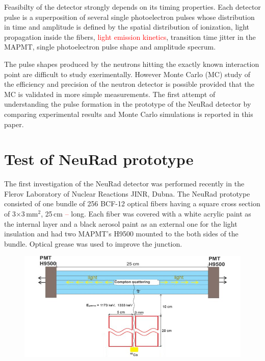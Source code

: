 \documentclass{webofc}
\newcommand{\red}[1]{\textcolor{red}{#1}}
\begin{document}
Feasibilty of the detector strongly depends on its timing properties. Each detector pulse is a superposition of several single photoelectron pulses whose distribution in time and amplitude is defined by the  spatial distribution of ionization, light propagation inside the fibers, \red{light emission kinetics}, transition time jitter in the MAPMT, single photoelectron pulse shape and  amplitude specrum.  

The pulse shapes produced by the neutrons hitting the exactly known interaction point are difficult to study exerimentally. However Monte Carlo (MC) study of the efficiency and precision of the neutron detector is possible provided that the MC is validated in more simple measurements.
The first attempt of understanding the pulse formation in the prototype of the NeuRad  detector by comparing experimental results and Monte Carlo simulations is reported in this paper. 

\section{Test of NeuRad prototype}

The first investigation of the NeuRad detector was performed recently in the Flerov Laboratory of Nuclear Reactions JINR, Dubna.
The NeuRad prototype consisted of one bundle of 256 BCF-12 \cite{crystals} optical fibers having a square cross section of 3$\times$3\,mm$^2$, 25\,cm \red{--} long. 
Each fiber was covered with a white acrylic paint as the internal layer and a black aerosol paint as an external one for the light insulation and had two MAPMT's H9500 \cite{hm} mounted to the both sides of the bundle. Optical grease was used to improve the junction.

\begin{figure}[h]
	\centering
	\includegraphics[width=0.7\linewidth]{NeuRadexperiment.png}
\label{ris:neuradexp}
\end{figure}
\end{document}
